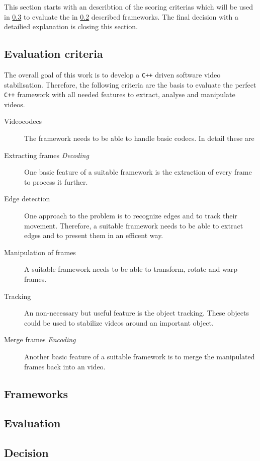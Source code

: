 This section starts with an describtion of the scoring criterias which will be used in \cref{sec:evaluation} to evaluate the in \cref{sec:frameworks} described frameworks. The final decision with a detailied explanation is closing this section.

\subsection{Evaluation criteria}\label{sec:requirementanal}
The overall goal of this work is to develop a \texttt{C++} driven software video stabilisation. Therefore, the following criteria are the basis to evaluate the perfect \texttt{C++} framework with all needed features to extract, analyse and manipulate videos.

\begin{description}
    \item[Videocodecs] The framework needs to be able to handle basic codecs. In detail these are \tbd
    \item[Extracting frames \textit{Decoding}] One basic feature of a suitable framework is the extraction of every frame to process it further.
    \item[Edge detection] One approach to the problem is to recognize edges and to track their movement. Therefore, a suitable framework needs to be able to extract edges and to present them in an efficent way.
    \item[Manipulation of frames] A suitable framework needs to be able to transform, rotate and warp frames.
    \item[Tracking] An non-necessary but useful feature is the object tracking. These objects could be used to stabilize videos around an important object.
    \item[Merge frames \textit{Encoding}] Another basic feature of a suitable framework is to merge the manipulated frames back into an video.
\end{description}

\subsection{Frameworks}\label{sec:frameworks}
\subsection{Evaluation}\label{sec:evaluation}
\subsection{Decision}\label{sec:decision}
